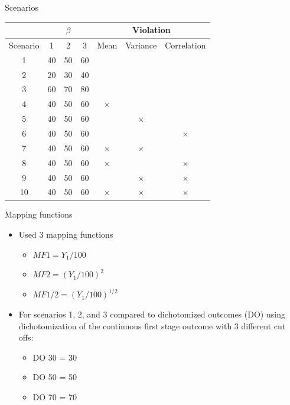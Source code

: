 \documentclass[pdftex]{beamer}
\begin{document}
\begin{frame}{Scenarios}
\begin{center}
\begin{tabular}{c|ccc|ccc}\hline
& \multicolumn{3}{c|}{$\beta$} & \multicolumn{3}{c}{Violation} \\ \hline 
Scenario & 1 & 2 & 3 & Mean & Variance & Correlation  \\ \hline
1 & 40 & 50 & 60 & &  &  \\
2 & 20 & 30 & 40 & &  &  \\
3 & 60 & 70 & 80 &  &  &  \\ 
4 & 40 & 50 & 60 & $\times$ & & \\
5 & 40 & 50 & 60 & & $\times$ & \\
6 & 40 & 50 & 60 & & & $\times$ \\
7 & 40 & 50 & 60 & $\times$ & $\times$ & \\
8 & 40 & 50 & 60 & $\times$ & & $\times$ \\
9 & 40 & 50 & 60 & & $\times$ & $\times$ \\
10 & 40 & 50 & 60 & $\times$ & $\times$ & $\times$\\ \hline
\end{tabular}
\end{center}
\end{frame}

\begin{frame}{Mapping functions}
\begin{itemize}
\item Used 3 mapping functions
\begin{itemize}
\item $MF 1 =  Y_1/100$
\item $MF 2 = (Y_1/100)^2$
\item $MF 1/2= (Y_1/100)^{1/2}$
\end{itemize}
\item For scenarios 1, 2, and 3 compared to dichotomized outcomes (DO) using dichotomization of the continuous first stage outcome with 3 different cut offs:
\begin{itemize}
\item DO 30 = 30
\item DO 50 = 50
\item DO 70 = 70
\end{itemize}
\end{itemize}
\end{frame}
\end{document}
